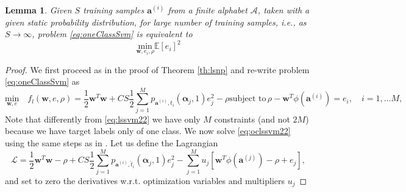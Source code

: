 \documentclass[draftcls,onecolumn,12pt]{IEEEtran}
\newcommand{\Exp}[1]{\mathbb{E}\left[#1\right]}
\newtheorem{lemma}{Lemma}
\begin{document}
\begin{lemma}
\label{lem:lem2}
Given $S$ training samples $\bm{a}^{(i)}$ from a finite alphabet $\mathcal A$, taken with a given static probability distribution, for large number of training samples, i.e., as $S \rightarrow \infty$, problem \eqref{eq:oneClassSvm} is equivalent to 
\begin{equation}
		\underset{\mathbf{w},e_i, \rho}{\text{min}} \Exp{e_i}^2
\end{equation}
\end{lemma}
\begin{proof}
We first proceed as in the proof of Theorem \ref{th:lsnp} and re-write problem \eqref{eq:oneClassSvm} as
	\begin{subequations}
		\label{eq:oclssvm22}
		\begin{equation}
		\label{eq:oclssvm2}
		\underset{\mathbf{w},e}{\text{min}} \quad f_l(\mathbf{w},e,\rho) = \frac{1}{2} \mathbf{w}^T \mathbf{w} + C S \frac{1}{2} \sum_{j=1}^M p_{\bm{a}^{(i)},t_i}(\bm{\alpha}_j,1) e_j^2 - \rho  
		\end{equation}
		\begin{equation}
		\label{eq:ocstpart2}
		\text{subject to}\,  \rho - \mathbf{w}^T \phi (\mathbf{a}^{(i)})  = e_i,  \quad i = 1,\dots M, 
		\end{equation}		
	\end{subequations} 
Note that differently from \eqref{eq:lssvm22} we have only $M$ constraints (and not $2M$) because we have target labels only of one class.
We now solve \eqref{eq:oclssvm22} using the same steps as in \cite{choi2009least}. Let us define the Lagrangian
\begin{equation}
	\mathcal{L} = 	\frac{1}{2} \mathbf{w}^T \mathbf{w} - \rho +
	C S \frac{1}{2} \sum_{j=1}^M p_{\bm{a}^{(i)},\hat{t}_i}(\bm{\alpha}_j,1) e_j^2 - 
	\sum_{j=1}^{M} u_j \left[ \mathbf{w}^T \phi (\mathbf{a}^{(j)}) -\rho + e_j \right],
\end{equation}
and set to zero the derivatives w.r.t. optimization variables and multipliers $u_j$


\end{proof}
\end{document}

